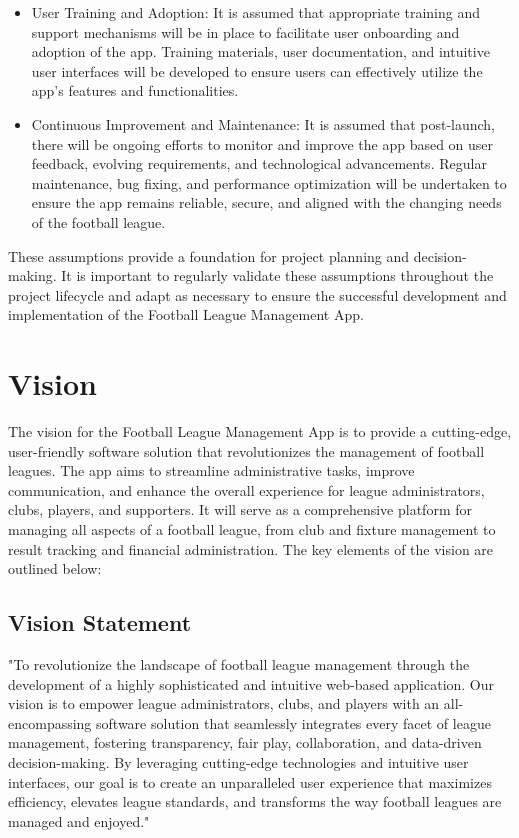 \documentclass[12pt]{article}
\begin{document}
\begin{itemize}
    \item User Training and Adoption: It is assumed that appropriate training and support mechanisms will be in place to facilitate user onboarding and adoption of the app. Training materials, user documentation, and intuitive user interfaces will be developed to ensure users can effectively utilize the app's features and functionalities.

    \item Continuous Improvement and Maintenance: It is assumed that post-launch, there will be ongoing efforts to monitor and improve the app based on user feedback, evolving requirements, and technological advancements. Regular maintenance, bug fixing, and performance optimization will be undertaken to ensure the app remains reliable, secure, and aligned with the changing needs of the football league.
\end{itemize}
These assumptions provide a foundation for project planning and decision-making. It is important to regularly validate these assumptions throughout the project lifecycle and adapt as necessary to ensure the successful development and implementation of the Football League Management App.
\section{Vision}
The vision for the Football League Management App is to provide a cutting-edge, user-friendly software solution that revolutionizes the management of football leagues. The app aims to streamline administrative tasks, improve communication, and enhance the overall experience for league administrators, clubs, players, and supporters. It will serve as a comprehensive platform for managing all aspects of a football league, from club and fixture management to result tracking and financial administration. The key elements of the vision are outlined below:
\subsection{Vision Statement}
"To revolutionize the landscape of football league management through the development of a highly sophisticated and intuitive web-based application. Our vision is to empower league administrators, clubs, and players with an all-encompassing software solution that seamlessly integrates every facet of league management, fostering transparency, fair play, collaboration, and data-driven decision-making. By leveraging cutting-edge technologies and intuitive user interfaces, our goal is to create an unparalleled user experience that maximizes efficiency, elevates league standards, and transforms the way football leagues are managed and enjoyed."
\end{document}
